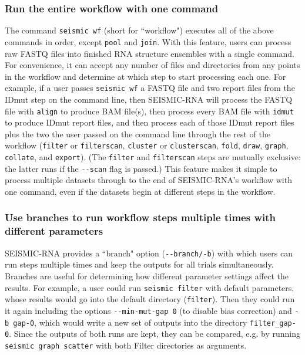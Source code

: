 \documentclass[unnumsec,webpdf,contemporary,large]{oup-authoring-template}%
\theoremstyle{thmstyleone}%
\theoremstyle{thmstyletwo}%
\theoremstyle{thmstylethree}%
\begin{document}
\subsubsection{Run the entire workflow with one command}

The command \verb|seismic wf| (short for ``workflow") executes all of the above commands in order, except \verb|pool| and \verb|join|.
With this feature, users can process raw FASTQ files into finished RNA structure ensembles with a single command.
For convenience, it can accept any number of files and directories from any points in the workflow and determine at which step to start processing each one.
For example, if a user passes \verb|seismic wf| a FASTQ file and two report files from the IDmut step on the command line, then SEISMIC-RNA will process the FASTQ file with \verb|align| to produce BAM file(s), then process every BAM file with \verb|idmut| to produce IDmut report files, and then process each of those IDmut report files plus the two the user passed on the command line through the rest of the workflow (\verb|filter| or \verb|filterscan|, \verb|cluster| or \verb|clusterscan|, \verb|fold|, \verb|draw|, \verb|graph|, \verb|collate|, and \verb|export|).
(The \verb|filter| and \verb|filterscan| steps are mutually exclusive: the latter runs if the \verb|--scan| flag is passed.)
This feature makes it simple to process multiple datasets through to the end of SEISMIC-RNA's workflow with one command, even if the datasets begin at different steps in the workflow.

\subsubsection{Use branches to run workflow steps multiple times with different parameters}

SEISMIC-RNA provides a ``branch" option (\verb|--branch/-b|) with which users can run steps multiple times and keep the outputs for all trials simultaneously.
Branches are useful for determining how different parameter settings affect the results.
For example, a user could run \verb|seismic filter| with default parameters, whose results would go into the default directory (\verb|filter|).
Then they could run it again including the options \verb|--min-mut-gap 0| (to disable bias correction) and \verb|-b gap-0|, which would write a new set of outputs into the directory \verb|filter_gap-0|.
Since the outputs of both runs are kept, they can be compared, e.g. by running \verb|seismic graph scatter| with both Filter directories as arguments.
\end{document}
